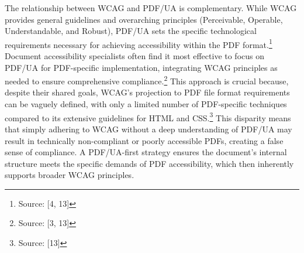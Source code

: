 The relationship between WCAG and PDF/UA is complementary. While WCAG provides general guidelines and overarching principles (Perceivable, Operable, Understandable, and Robust), PDF/UA sets the specific technological requirements necessary for achieving accessibility within the PDF format.\footnote{Source: [4, 13]} Document accessibility specialists often find it most effective to focus on PDF/UA for PDF-specific implementation, integrating WCAG principles as needed to ensure comprehensive compliance.\footnote{Source: [3, 13]} This approach is crucial because, despite their shared goals, WCAG's projection to PDF file format requirements can be vaguely defined, with only a limited number of PDF-specific techniques compared to its extensive guidelines for HTML and CSS.\footnote{Source: [13]} This disparity means that simply adhering to WCAG without a deep understanding of PDF/UA may result in technically non-compliant or poorly accessible PDFs, creating a false sense of compliance. A PDF/UA-first strategy ensures the document's internal structure meets the specific demands of PDF accessibility, which then inherently supports broader WCAG principles.

